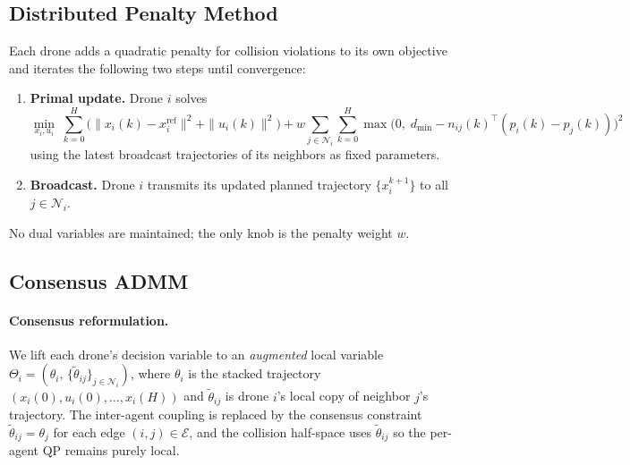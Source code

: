 \documentclass[11pt,onecolumn]{article}
\newcommand{\dmin}{d_{\min}}
\begin{document}
\subsection{Distributed Penalty Method}

Each drone adds a quadratic penalty for collision violations to its own objective and
iterates the following two steps until convergence:

\begin{enumerate}
  \item \textbf{Primal update.}  Drone $i$ solves
    \[
      \min_{x_i, u_i} \;
        \sum_{k=0}^{H}\!\bigl(\|x_i(k)-x_i^{\mathrm{ref}}\|^2
        + \|u_i(k)\|^2\bigr)
        + w \sum_{j \in \mathcal{N}_i} \sum_{k=0}^{H}
          \max\!\bigl(0,\; \dmin - n_{ij}(k)^\top(p_i(k)-p_j(k))\bigr)^2
    \]
    using the latest broadcast trajectories of its neighbors as fixed parameters.
  \item \textbf{Broadcast.}  Drone $i$ transmits its updated planned trajectory
    $\{x_i^{k+1}\}$ to all $j \in \mathcal{N}_i$.
\end{enumerate}

No dual variables are maintained; the only knob is the penalty weight $w$.

\subsection{Consensus ADMM}

\paragraph{Consensus reformulation.}
We lift each drone's decision variable to an \emph{augmented} local variable
$\Theta_i = (\theta_i,\, \{\tilde\theta_{ij}\}_{j \in \mathcal{N}_i})$, where
$\theta_i$ is the stacked trajectory $(x_i(0), u_i(0), \ldots, x_i(H))$ and
$\tilde\theta_{ij}$ is drone $i$'s local copy of neighbor $j$'s trajectory.
The inter-agent coupling is replaced by the consensus constraint
$\tilde\theta_{ij} = \theta_j$ for each edge $(i,j) \in \mathcal{E}$, and the
collision half-space uses $\tilde\theta_{ij}$ so the per-agent QP remains purely
local.
\end{document}
